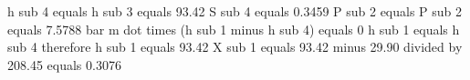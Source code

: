 h sub 4 equals h sub 3 equals 93.42  
S sub 4 equals 0.3459  
P sub 2 equals P sub 2 equals 7.5788 bar  
m dot times (h sub 1 minus h sub 4) equals 0  
h sub 1 equals h sub 4 therefore h sub 1 equals 93.42  
X sub 1 equals 93.42 minus 29.90 divided by 208.45 equals 0.3076